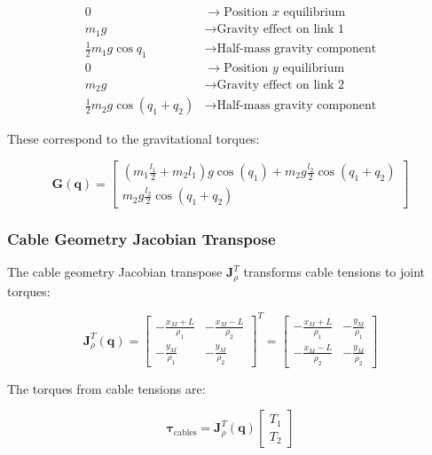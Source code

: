 \begin{equation}
\boxed{\begin{aligned}
0 &\rightarrow \text{Position } x \text{ equilibrium} \\
m_1 g &\rightarrow \text{Gravity effect on link 1} \\
\frac{1}{2}m_1 g \cos q_1 &\rightarrow \text{Half-mass gravity component} \\
0 &\rightarrow \text{Position } y \text{ equilibrium} \\
m_2 g &\rightarrow \text{Gravity effect on link 2} \\
\frac{1}{2}m_2 g \cos(q_1+q_2) &\rightarrow \text{Half-mass gravity component}
\end{aligned}}
\end{equation}

These correspond to the gravitational torques:

\begin{equation}
\mathbf{G}(\mathbf{q}) = \begin{bmatrix}
\left(m_1 \frac{l_1}{2} + m_2 l_1\right) g \cos(q_1) + m_2 g \frac{l_2}{2} \cos(q_1 + q_2) \\
m_2 g \frac{l_2}{2} \cos(q_1 + q_2)
\end{bmatrix}
\end{equation}

\subsubsection{Cable Geometry Jacobian Transpose}

The cable geometry Jacobian transpose $\mathbf{J}_{\rho}^T$ transforms cable tensions to joint torques:

\begin{equation}
\mathbf{J}_{\rho}^T(\mathbf{q}) = \begin{bmatrix}
-\frac{x_M + L}{\rho_1} & -\frac{x_M - L}{\rho_2} \\
-\frac{y_M}{\rho_1} & -\frac{y_M}{\rho_2}
\end{bmatrix}^T = \begin{bmatrix}
-\frac{x_M + L}{\rho_1} & -\frac{y_M}{\rho_1} \\
-\frac{x_M - L}{\rho_2} & -\frac{y_M}{\rho_2}
\end{bmatrix}
\end{equation}

The torques from cable tensions are:

\begin{equation}
\boldsymbol{\tau}_{\text{cables}} = \mathbf{J}_{\rho}^T(\mathbf{q}) \begin{bmatrix} T_1 \\ T_2 \end{bmatrix}
\end{equation}

